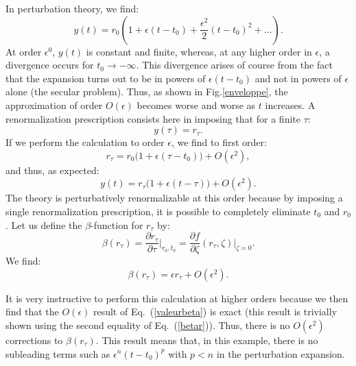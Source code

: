 \documentclass[floatfix,preprintnumbers,amsmath,amssymb,prb,12pt]{revtex4-1}
\begin{document}
{{In perturbation theory, we find:
\begin{equation}
y(t)= r_0 (1+\epsilon(t-t_0) +\frac{\epsilon^2}{2}(t-t_0)^2
+\dots).
\label{approx_ordre_eps}
\end{equation}
At order $\epsilon^0$, $y(t)$ is constant and finite, whereas, at
any higher order in $\epsilon$, a divergence occurs for
$t_0\to-\infty$. This divergence arises of course from the fact
that the expansion turns out to be in powers of 
$\epsilon(t-t_0)$ and not in powers of $\epsilon$ alone (the
secular problem). Thus, as shown in Fig.\ref{enveloppe}, the
approximation of order
$O(\epsilon)$ becomes worse and worse as
$t$ increases. A renormalization prescription consists here in
imposing that for a finite $\tau$:
\begin{equation}
y(\tau)=r_\tau.
\label{tauprescription}
\end{equation}
If we perform the calculation to order $\epsilon$, we find to
first order:
\begin{equation}
r_\tau= r_0\big(1+\epsilon(\tau-t_0)\big) +O(\epsilon^2),
\label{rtau}
\end{equation}
and thus, as expected:
\begin{equation}
y(t)=r_\tau\big(1+\epsilon(t-\tau)\big) +O(\epsilon^2).
\label{yrtau}
\end{equation}
The theory is perturbatively renormalizable at this order because by imposing a
single renormalization prescription, it is possible to completely
eliminate
$t_0$ and $r_0$.
Let us define the $\beta$-function for $r_\tau$ by:
\begin{equation}
\beta(r_\tau) = \frac{\partial
r_\tau}{\partial\tau}\bigg|_{r_0,t_0}=\frac{\partial f}{\partial
\zeta}(r_\tau,\zeta)\bigg|_{\zeta=0}.
\label{betar}
\end{equation}
We find:
\begin{equation}
\beta(r_\tau) = \epsilon r_\tau +O(\epsilon^2).
\label{valeurbeta}
\end{equation}

It is very instructive to perform this calculation at higher
orders because we then find that the $O(\epsilon)$ result of
Eq.~(\ref{valeurbeta}) is exact (this result is trivially shown
using the second equality of Eq.~(\ref{betar})). Thus, there is no
$O(\epsilon^2)$ corrections to $\beta(r_\tau)$. This result means that, in this example, there is no subleading terms
such as
$\epsilon^n (t-t_0)^p$ with $p<n$ in the perturbation expansion.

}}
\end{document}

